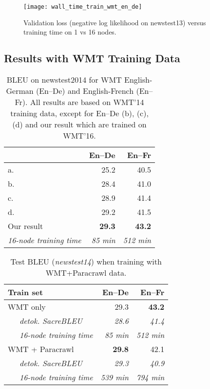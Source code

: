 \documentclass[11pt,a4paper]{article}
\begin{document}
\begin{figure}
\centering
\texttt{[image: wall\_time\_train\_wmt\_en\_de]}
\caption{Validation loss (negative log likelihood on newstest13) versus training time on 1 vs 16 nodes.}
\label{fig:walltime}
\end{figure}


\subsection{Results with WMT Training Data}

\begin{table}[t]
\centering
\begin{tabular}{l|r r}
\toprule
                               & En--De   & En--Fr \\
\hline
a. \citet{gehring2017convs2s}    &  25.2    & 40.5 \\
b. \citet{vaswani2017transformer}&  28.4    & 41.0 \\
c. \citet{ahmed2017WeightedTN}   &  28.9    & 41.4 \\
d. \citet{shaw2018relpos}        &  29.2    & 41.5 \\
\midrule
Our result                    & {\bf 29.3}    & {\bf 43.2} \\
{\it 16-node training time}   & {\it 85 min} & {\it 512 min}\\
\bottomrule
\end{tabular}
\caption{BLEU on newstest2014 for WMT English-German (En--De) and English-French (En--Fr). All results are based on WMT'14 training data, except for En--De (b), (c), (d) and our result which are trained on WMT'16. 
}
\label{tab:testwmt}
\end{table}

\begin{table}[t]
\centering
\begin{tabular}{l|r r}
\toprule
Train set                   & En--De   & En--Fr \\
\hline
WMT only                    &  29.3  & {\bf 43.2} \\
~~~{\it detok. SacreBLEU}   	& {\it 28.6}     & {\it 41.4} \\
~~~{\it 16-node training time} & {\it 85 min} & {\it 512 min}\\
\midrule
WMT + Paracrawl             &  {\bf 29.8}  &  42.1 \\
~~~{\it detok. SacreBLEU}      &  {\it 29.3}  & {\it 40.9} \\
~~~{\it 16-node training time} & {\it 539 min} & {\it 794 min}\\
\bottomrule
\end{tabular}
\caption{Test BLEU (\emph{newstest14}) when training with WMT+Paracrawl data.\label{tab:testpara}}
\end{table}
\end{document}
